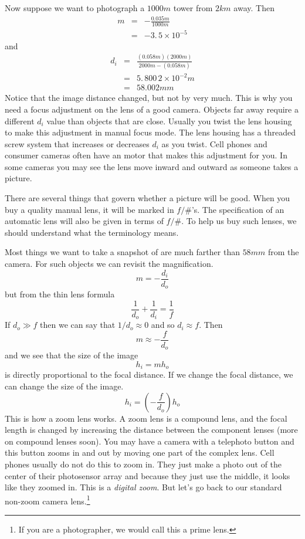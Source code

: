 \documentclass{article}
\begin{document}
Now suppose we want to photograph a $1000\unit{m}$ tower from $2\unit{km}$
away. Then%
\begin{eqnarray*}
m &=&-\frac{0.035\unit{m}}{1000\unit{m}} \\
&=&-3.\,\allowbreak 5\times 10^{-5}
\end{eqnarray*}%
and 
\begin{eqnarray*}
d_{i} &=&\frac{\left( 0.058\unit{m}\right) \left( 2000\unit{m}\right) }{2000%
\unit{m}-\left( 0.058\unit{m}\right) } \\
&=&5.\,\allowbreak 800\,2\times 10^{-2}\unit{m} \\
&=&58.002\unit{mm}
\end{eqnarray*}%
Notice that the image distance changed, but not by very much. This is why
you need a focus adjustment on the lens of a good camera. Objects far away
require a different $d_{i}$ value than objects that are close. Usually you
twist the lens housing to make this adjustment in manual focus mode. The
lens housing has a threaded screw system that increases or decreases $d_{i}$
as you twist. Cell phones and consumer cameras often have an motor that
makes this adjustment for you. In some cameras you may see the lens move
inward and outward as someone takes a picture.

There are several things that govern whether a picture will be good. When
you buy a quality manual lens, it will be marked in $f/\#$'s. The
specification of an automatic lens will also be given in terms of $f/\#$. To
help us buy such lenses, we should understand what the terminology means.

Most things we want to take a snapshot of are much farther than $58\unit{mm}$
from the camera. For such objects we can revisit the magnification.%
\[
m=-\frac{d_{i}}{d_{o}}
\]%
but from the thin lens formula%
\[
\frac{1}{d_{o}}+\frac{1}{d_{i}}=\frac{1}{f}
\]%
If $d_{o}\gg f$ then we can say that $1/d_{o}\approx 0$ and so $d_{i}\approx
f.$ Then%
\[
m\approx -\frac{f}{d_{o}}
\]%
and we see that the size of the image 
\[
h_{i}=mh_{o}
\]%
is directly proportional to the focal distance. If we change the focal
distance, we can change the size of the image. 
\[
h_{i}=\left( -\frac{f}{d_{o}}\right) h_{o}
\]%
This is how a zoom lens works. A zoom lens is a compound lens, and the focal
length is changed by increasing the distance between the component lenses
(more on compound lenses soon). You may have a camera with a telephoto
button and this button zooms in and out by moving one part of the complex
lens. Cell phones usually do not do this to zoom in. They just make a photo
out of the center of their photosensor array and because they just use the
middle, it looks like they zoomed in. This is a \emph{digital zoom}. But
let's go back to our standard non-zoom camera lens.\footnote{%
If you are a photographer, we would call this a prime lens.}
\end{document}
